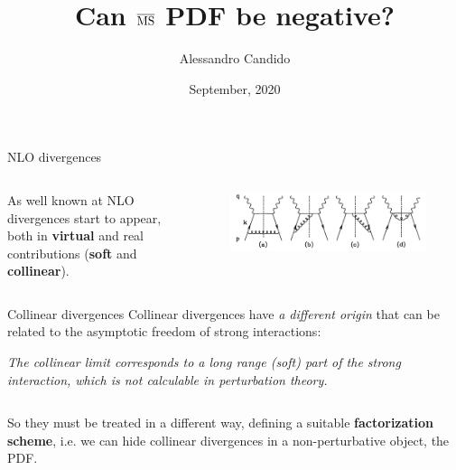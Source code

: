 \documentclass[8pt]{beamer}
\title{Can $\operatorname{\overline{MS}}$ PDF be negative?}
\date{September, 2020}
\author{Alessandro Candido
}
\begin{document}
\maketitle

\begin{frame}{NLO divergences}
    \begin{columns}
        \begin{column}{0.4\textwidth}
            As well known at NLO divergences start to appear, both in \textbf{virtual}
            and real contributions (\textbf{soft} and \textbf{collinear}).
        \end{column}

        \begin{column}{0.55\textwidth}
            \begin{figure}
                \centering
                \includegraphics[width=\textwidth]{pictures/nlo-real}
            \end{figure}
        \end{column}
    \end{columns}

    \vspace*{10pt}

    \begin{block}{Collinear divergences}
    \vspace*{1pt}
    Collinear divergences have \textit{a different origin} that can be
    related to the asymptotic freedom of strong interactions:
    \end{block}

    \begin{center}
        \textit{The collinear limit corresponds to a long range (soft)
        part of the strong interaction, which is not calculable in
        perturbation theory.}
    \end{center}

    \begin{columns}
        \begin{column}{0.4\textwidth}
            So they must be treated in a different way, defining a suitable
            \textbf{factorization scheme},\newline
            i.e. we can hide collinear divergences in a non-perturbative
            object, the PDF.


\end{column}
\end{columns}
\end{frame}
\end{document}
